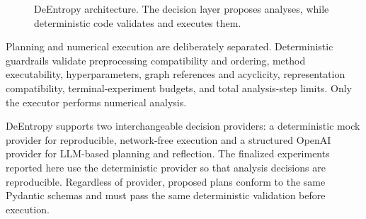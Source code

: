 \documentclass[10pt]{article}
\begin{document}
\begin{figure}[h!]
\centering
{}
\caption{DeEntropy architecture. The decision layer proposes analyses, while
deterministic code validates and executes them.}
\label{fig:architecture}
\end{figure}

Planning and numerical execution are deliberately separated. Deterministic
guardrails validate preprocessing compatibility and ordering, method
executability, hyperparameters, graph references and acyclicity,
representation compatibility, terminal-experiment budgets, and total
analysis-step limits. Only the executor performs numerical analysis.

DeEntropy supports two interchangeable decision providers: a deterministic
mock provider for reproducible, network-free execution and a structured OpenAI
provider for LLM-based planning and reflection. The finalized experiments
reported here use the deterministic provider so that analysis decisions are
reproducible. Regardless of provider, proposed plans conform to the same
Pydantic schemas and must pass the same deterministic validation before
execution.
\end{document}
